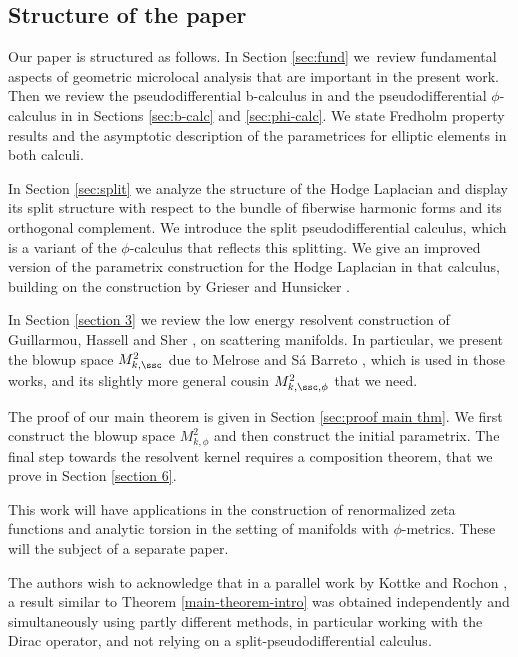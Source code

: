 \subsection{Structure of the paper}
Our paper is structured as follows. In Section \ref{sec:fund} we~review fundamental
aspects of geometric microlocal analysis that are important in the
present work. Then we review the pseudodifferential b-calculus in \cite{melrose1993atiyah}
and the pseudodifferential $\phi$-calculus in \cite{mazzeo1998pseudodifferential} in Sections \ref{sec:b-calc} and \ref{sec:phi-calc}.
We state Fredholm property results and the asymptotic description of the parametrices
for elliptic elements in both calculi.

In Section \ref{sec:split} we analyze the structure of the Hodge Laplacian and display its split structure with respect to the bundle of fiberwise harmonic forms and its orthogonal complement. We introduce the split pseudodifferential calculus, which is a variant of the $\phi$-calculus that reflects this splitting. We give an improved version of the parametrix construction for the Hodge Laplacian in that calculus, building on the construction by
Grieser and Hunsicker \cite{grieser-para}.

In Section \ref{section 3} we review the low energy resolvent construction of Guillarmou, Hassell and Sher \cite{guillarmou2008resolvent}, \cite{guillarmou2014low} on scattering manifolds. In particular, we present the blowup space $M^2_{k,\ssc}$
due to Melrose and S{\'a} Barreto \cite{melrosesabarreto}, which is used in those works, and its slightly more general cousin $M^2_{k,\ssc,\phi}$ that we need.

The proof of our main theorem is given in Section \ref{sec:proof main thm}.
We first construct the blowup space $M^2_{k,\phi}$ and then construct the initial parametrix. The final step towards the resolvent kernel requires a composition theorem, that we prove in Section \ref{section 6}.

This work will have applications in the construction of renormalized zeta functions
and analytic torsion
in the setting of manifolds with $\phi$-metrics. These will the subject of a separate paper.

\begin{Rem}
The authors wish to acknowledge that in a parallel work by Kottke and Rochon \cite{kottke-rochon},
a result similar to Theorem \ref{main-theorem-intro} was obtained independently and simultaneously
using partly different methods, in particular working with the Dirac operator, and not
relying on a split-pseudodifferential calculus. \end{Rem}

